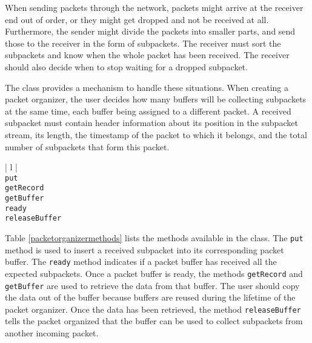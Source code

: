 When sending packets through the network, packets might arrive at the receiver end out of order, or they 
might get dropped and not be received at all. Furthermore, the sender might divide the packets into smaller 
parts, and send those to the receiver in the form of subpackets. The receiver must sort the subpackets and 
know when the whole packet has been received. The receiver should also decide when to stop waiting for a 
dropped subpacket.

The \PacketOrganizer{} class provides a mechanism to handle these situations. When creating a packet 
organizer, the user decides how many buffers will be collecting subpackets at the same time, each buffer
being assigned to a different packet. A received subpacket must contain header information about its position 
in the subpacket stream, its length, the timestamp of the packet to which it belongs, and the total number of 
subpackets that form this packet.

\begin{table}[ht]
\caption{Public methods in the \PacketOrganizer{} class}
\begin{center}
\begin{tabular}{| l |}
	\hline 
	 \\
	\hline \hline
	\texttt{put} \\
	\texttt{getRecord} \\
	\texttt{getBuffer} \\
	\texttt{ready} \\
	\texttt{releaseBuffer} \\
	\hline
\end{tabular}
\end{center}
\label{packetorganizermethods}
\end{table}

Table \ref{packetorganizermethods} lists the methods available in the \PacketOrganizer{} class. The 
\texttt{put} method is used to insert a received subpacket into its corresponding packet buffer. The 
\texttt{read\-y} method indicates if a packet buffer has received all the expected subpackets. Once a packet
buffer is ready, the methods \texttt{get\-Re\-cord} and \texttt{get\-Buff\-er} are used to retrieve the data from
that buffer. The user should copy the data out of the buffer because buffers are reused during the lifetime of 
the packet organizer. Once the data has been retrieved, the method \texttt{re\-lease\-Buff\-er} tells the 
packet organized that the buffer can be used to collect subpackets from another incoming packet.

